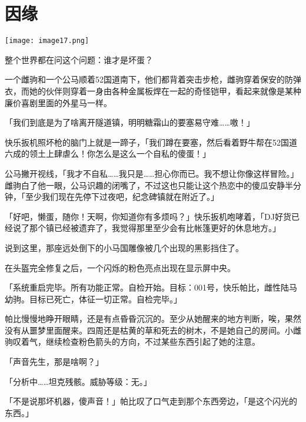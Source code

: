 \chapter{因缘}

\texttt{[image: image17.png]}

\begin{intro}
    整个世界都在问这个问题：谁才是坏蛋？
\end{intro}


一个雌驹和一个公马顺着52国道南下，他们都背着突击步枪，雌驹穿着保安的防弹衣，而她的伙伴则穿着一身由各种金属板焊在一起的奇怪铠甲，看起来就像是某种廉价喜剧里面的外星马一样。

「我们到底是为了啥离开隧道镇，明明糖霜山的要塞易守难……嗷！」

快乐扳机照坏枪的脑门上就是一蹄子，「我们蹲在要塞，然后看着野牛帮在52国道六成的领土上肆虐么！你怎么是这么一个自私的傻蛋！」

公马撇开视线，「我才不自私……我只是……担心你而已。我不想让你像这样冒险。」雌驹白了他一眼，公马识趣的闭嘴了，不过这也只能让这个热恋中的傻瓜安静半分钟，「至少我们现在先停下过夜吧，纪念碑镇就在附近了。」

「好吧，懒蛋，随你！天啊，你知道你有多烦吗？」快乐扳机咆哮着，「DJ好货已经说了那个镇已经被遗弃了，我觉得那里至少会有比帐篷更好的休息地方。」

说到这里，那座远处倒下的小马国雕像被几个出现的黑影挡住了。

\horizonline


在头盔完全修复之后，一个闪烁的粉色亮点出现在显示屏中央。

「{\mt 系统重启完毕。所有功能正常。自检开始。目标：001号，快乐帕比，雌性陆马幼驹。目标已死亡，体征一切正常。自检完毕。}」

帕比慢慢地睁开眼睛，还是有点昏昏沉沉的。至少从她醒来的地方判断，唉，果然没有从噩梦里面醒来。四周还是枯黄的草和死去的树木，不是她自己的房间。小雌驹叹着气，继续检查粉色箭头的方向，不过某些东西引起了她的注意。

「声音先生，那是啥啊？」

「{\mt 分析中……坦克残骸。威胁等级：无。}」

「不是说那坏机器，傻声音！」帕比叹了口气走到那个东西旁边，「是这个闪光的东西。」

